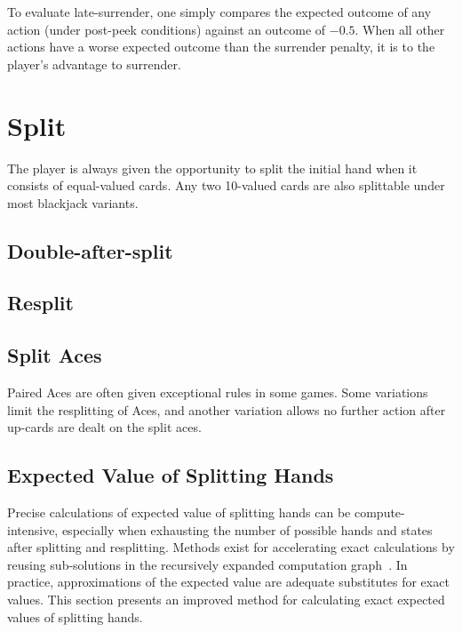 To evaluate late-surrender, one simply compares the expected outcome
of any action (under post-peek conditions) against an outcome of $-0.5$.
When all other actions have a worse expected outcome than the surrender
penalty, it is to the player's advantage to surrender.

\section{Split}
\label{sec:basic:split}

The player is always given the opportunity to split
the initial hand when it consists of equal-valued cards.
Any two 10-valued cards are also splittable under most blackjack variants.

\subsection{Double-after-split}
\label{sec:basic:DAS}


\subsection{Resplit}
\label{sec:basic:resplit}


\subsection{Split Aces}
\label{sec:basic:split-aces}

Paired Aces are often given exceptional rules in some games.
Some variations limit the resplitting of Aces, 
and another variation allows no further action after
up-cards are dealt on the split aces.  

\subsection{Expected Value of Splitting Hands}
\label{sec:basic:split:calc}

Precise calculations of expected value of splitting hands can be 
compute-intensive, especially when exhausting the number of 
possible hands and states after splitting and resplitting.
Methods exist for accelerating exact calculations by 
reusing sub-solutions in the recursively expanded 
computation graph~\cite{ref:nairn08}.
In practice, approximations of the expected value are adequate 
substitutes for exact values\cite{ref:griffin99}.  
This section presents an improved method for calculating exact 
expected values of splitting hands.

